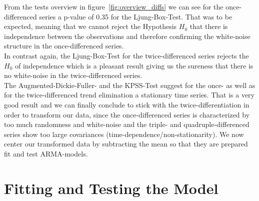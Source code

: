 \documentclass[11pt,a4paper]{article}
\begin{document}
From the tests overview in figure~\ref{fig:overview_diffs}
we can see for the once-differenced series a p-value of 0.35 for the Ljung-Box-Test. That was to be expected, meaning that we cannot reject the Hypothesis $H_0$ that there is independence between the observations \citep{LjungBox78} and therefore confirming the white-noise structure in the once-differenced series. \\
In contrast again, the Ljung-Box-Test for the twice-differenced series rejects the $H_0$ of independence which is a pleasant result giving us the sureness that there is no white-noise in the twice-differenced series.
\\
The Augmented-Dickie-Fuller- and the KPSS-Test suggest for the once- as well as for the twice-differenced trend elimination a stationary time series. That is a very good result and we can finally conclude to stick with the twice-differentiation in order to transform our data, since the once-differenced series is characterized by too much randomness and white-noise and the triple- and quadruple-differenced series show too large covariances (time-dependence/non-stationarity). We now center our transformed data 
by subtracting the mean so that they are prepared fit and test ARMA-models.


\section{Fitting and Testing the Model} \label{Fitting and Testing the Model}
\end{document}
